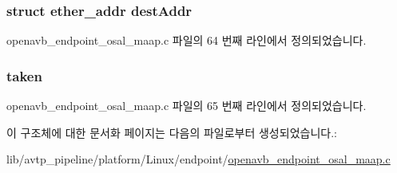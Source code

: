 \subsubsection[{\texorpdfstring{dest\+Addr}{destAddr}}]{\setlength{\rightskip}{0pt plus 5cm}struct ether\+\_\+addr dest\+Addr}\hypertarget{structmaap_alloc__t_ae93ae3d7d2964e3559e9b0df6f477238}{}\label{structmaap_alloc__t_ae93ae3d7d2964e3559e9b0df6f477238}


openavb\+\_\+endpoint\+\_\+osal\+\_\+maap.\+c 파일의 64 번째 라인에서 정의되었습니다.

\subsubsection[{\texorpdfstring{taken}{taken}}]{ taken}\hypertarget{structmaap_alloc__t_a2f82d1d1293c3de8527c67be4b2880f9}{}\label{structmaap_alloc__t_a2f82d1d1293c3de8527c67be4b2880f9}


openavb\+\_\+endpoint\+\_\+osal\+\_\+maap.\+c 파일의 65 번째 라인에서 정의되었습니다.



이 구조체에 대한 문서화 페이지는 다음의 파일로부터 생성되었습니다.\+:\begin{DoxyCompactItemize}
\item 
lib/avtp\+\_\+pipeline/platform/\+Linux/endpoint/\hyperlink{openavb__endpoint__osal__maap_8c}{openavb\+\_\+endpoint\+\_\+osal\+\_\+maap.\+c}\end{DoxyCompactItemize}
